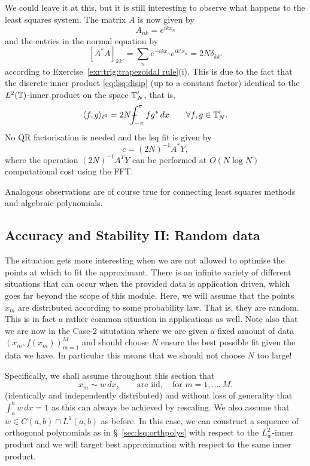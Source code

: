 We could leave it at this, but it is still interesting to observe what happens 
to the least squares system. The matrix $A$ is now given by 
\[
    A_{nk} = e^{ikx_n}
\]
and the entries in the normal equation by 
\[
    [A^* A]_{kk'} = \sum_{n} e^{-ikx_n} e^{ik' x_n} = 2 N \delta_{kk'}
\]
according to Exercise~\ref{exr:trig:trapezoidal rule}(i). 
This is due to the fact that the discrete inner product 
\eqref{eq:lsq:disip}  (up to a constant factor) identical to 
the $L^2(\mathbb{T})$-inner product on the space $\mathbb{T}_N'$, that is, 
\[
    \< f, g \>_{\ell^2} = 2N \mint_{-\pi}^\pi f g^* \,dx \qquad 
    \forall f, g \in \TT_N'.
\]
No QR factorisation is needed and the lsq fit is given by 
\[
    c = (2 N)^{-1} A^* Y,  
\]
where the operation $(2N)^{-1} A^T Y$ can be performed at $O(N \log N)$
computational cost using the FFT. 

Analogous observations are of course true for connecting least squares 
methods and algebraic polynomials. 


\subsection{Accuracy and Stability II: Random data}
%
\label{sec:lsq:rand}
%
The situation gets more interesting when we are not allowed to optimise the
points at which to fit the approximant. There is an infinite variety of
different situations that can occur when the provided data is application
driven, which goes far beyond the scope of this module. Here, we will assume
that the points $x_m$ are distributed according to some probability law. That
is, they are random. This is in fact a rather common situation in applications
as well. Note also that we are now in the Case-2 situtation where we are given a
fixed amount of data $(x_m, f(x_m))_{m = 1}^M$ and should choose $N$ ensure the
best possible fit given the data we have. In particular this means that we
should not choose $N$ too large!

Specifically, we shall assume throughout this section that 
\begin{equation}
    \label{eq:lsw:wm_law}
    x_m \sim w \,dx, \qquad \text{are iid}, \quad \text{for } m = 1, \dots, M.
\end{equation}
(identically and independently distributed) and without loss of generality that
$\int_a^b w \,dx = 1$ as this can always be achieved by rescaling. We also
assume that $w \in C(a,b) \cap L^1(a,b)$ as before. In this case, we can
construct a sequence of orthogonal polynomials as in \S~\ref{sec:lsq:orthpolys}
with respect to the $L^2_w$-inner product and we will target best approximation 
with respect to the same inner product. 

